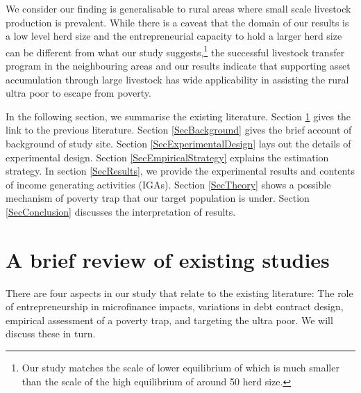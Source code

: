 	We consider our finding is generalisable to rural areas where small scale livestock production is prevalent. While there is a caveat that the domain of our results is a low level herd size and the entrepreneurial capacity to hold a larger herd size can be different from what our study suggests,\footnote{Our study matches the scale of lower equilibrium of \citet{Lybbertetal2004} which is much smaller than the scale of the high equilibrium of around 50 herd size. } the successful livestock transfer program in the neighbouring areas \citep{BandieraBRAC2017, Balboni2020} and our results indicate that supporting asset accumulation through large livestock has wide applicability in assisting the rural ultra poor to escape from poverty.


	In the following section, we summarise the existing literature. Section \ref{SecExistingStudies} gives the link to the previous literature. Section \ref{SecBackground} gives the brief account of background of study site. Section \ref{SecExperimentalDesign} lays out the details of experimental design. Section \ref{SecEmpiricalStrategy} explains the estimation strategy. In section \ref{SecResults}, we provide the experimental results and contents of income generating activities (IGAs). Section \ref{SecTheory} shows a possible mechanism of poverty trap that our target population is under. Section \ref{SecConclusion} discusses the interpretation of results.

\section{A brief review of existing studies}
\label{SecExistingStudies}

	There are four aspects in our study that relate to the existing literature: The role of entrepreneurship in microfinance impacts, variations in debt contract design, empirical assessment of a poverty trap, and targeting the ultra poor. We will discuss these in turn.

